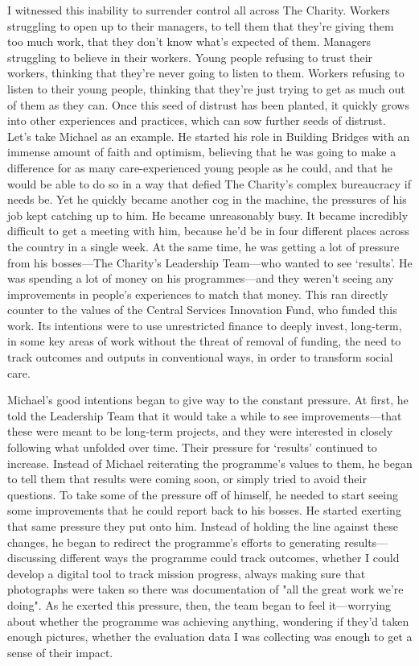 I witnessed this inability to surrender control all across The Charity. Workers struggling to open up to their managers, to tell them that they’re giving them too much work, that they don’t know what's expected of them. Managers struggling to believe in their workers. Young people refusing to trust their workers, thinking that they’re never going to listen to them. Workers refusing to listen to their young people, thinking that they’re just trying to get as much out of them as they can. Once this seed of distrust has been planted, it quickly grows into other experiences and practices, which can sow further seeds of distrust. Let’s take Michael as an example. He started his role in Building Bridges with an immense amount of faith and optimism, believing that he was going to make a difference for as many care-experienced young people as he could, and that he would be able to do so in a way that defied The Charity's complex bureaucracy if needs be. Yet he quickly became another cog in the machine, the pressures of his job kept catching up to him. He became unreasonably busy. It became incredibly difficult to get a meeting with him, because he’d be in four different places across the country in a single week. At the same time, he was getting a lot of pressure from his bosses—The Charity’s Leadership Team—who wanted to see `results'. He was spending a lot of money on his programmes—and they weren’t seeing any improvements in people’s experiences to match that money. This ran directly counter to the values of the Central Services Innovation Fund, who funded this work. Its intentions were to use unrestricted finance to deeply invest, long-term, in some key areas of work without the threat of removal of funding, the need to track outcomes and outputs in conventional ways, in order to transform social care.

Michael’s good intentions began to give way to the constant pressure. At first, he told the Leadership Team that it would take a while to see improvements—that these were meant to be long-term projects, and they were interested in closely following what unfolded over time. Their pressure for `results' continued to increase. Instead of Michael reiterating the programme's values to them, he began to tell them that results were coming soon, or simply tried to avoid their questions. To take some of the pressure off of himself, he needed to start seeing some improvements that he could report back to his bosses. He started exerting that same pressure they put onto him. Instead of holding the line against these changes, he began to redirect the programme’s efforts to generating results—discussing different ways the programme could track outcomes, whether I could develop a digital tool to track mission progress, always making sure that photographs were taken so there was documentation of "all the great work we’re doing". As he exerted this pressure, then, the team began to feel it—worrying about whether the programme was achieving anything, wondering if they’d taken enough pictures, whether the evaluation data I was collecting was enough to get a sense of their impact.

